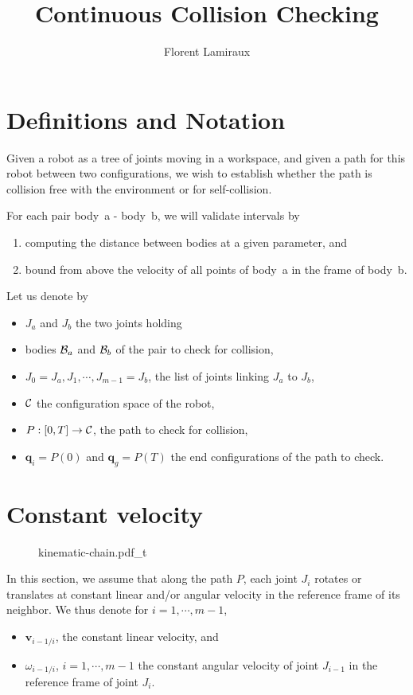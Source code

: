 \documentclass {article}
\title {Continuous Collision Checking}
\author {Florent Lamiraux}
\newcommand\body{{\cal B}}
\newcommand\CS{{\cal C}}
\newcommand\path{P}
\newcommand\conf{\textbf{q}}
\newcommand\linvel{\textbf{v}}
\newcommand\angvel{\omega}
\begin{document}
\maketitle
\section {Definitions and Notation}

Given a robot as a tree of joints moving in a workspace, and given a path for
this robot between two configurations, we wish to establish whether the path
is collision free with the environment or for self-collision.

For each pair body~a - body~b, we will validate intervals by
\begin {enumerate}
\item computing the distance between bodies at a given parameter, and
\item bound from above the velocity of all points of body~a in the frame of
  body~b.
\end {enumerate}

Let us denote by
\begin{itemize}
\item $J_a$ and $J_b$ the two joints holding
\item bodies $\body_a$ and $\body_b$ of the pair to check for collision,
\item $J_0 = J_a, J_1, \cdots, J_{m-1} = J_b$, the list of joints linking $J_a$ to $J_b$,
\item $\CS$ the configuration space of the robot,
\item $\path: [0, T] \rightarrow \CS$, the path to check for collision,
\item $\conf_{i} = \path (0)$ and $\conf_{g} = \path (T)$ the end configurations
of the path to check.
\end{itemize}

\section {Constant velocity}

\begin{figure}[ht]
\centerline {
   {kinematic-chain.pdf_t}
}
\end{figure}

In this section, we assume that along the path $\path$, each joint $J_i$ rotates or translates at constant linear and/or angular velocity in the reference frame of its neighbor. We thus denote for $i=1,\cdots,m-1$,
\begin {itemize}
\item $\linvel_{i-1/i}$,  the constant linear velocity, and
\item $\angvel_{i-1/i}$, $i=1,\cdots,m-1$ the constant angular velocity of joint
$J_{i-1}$ in the reference frame of joint $J_{i}$.
\end {itemize}
\end{document}
